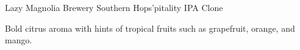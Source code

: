 \begin{recipe}{Lazy Magnolia Brewery Southern Hops'pitality IPA Clone}

\begin{aboutblock}
Bold citrus aroma with hints of tropical fruits such as grapefruit, orange,
and mango. \sourceaha
\end{aboutblock}


\begin{methodandtiming}
 
\begin{mashsteps}
\end{mashsteps}

\begin{fermentationsteps}
\end{fermentationsteps}

\end{methodandtiming}

\recipebreak

\begin{ingredientsblock}

\begin{malts}
\end{malts}

\begin{hops}
\end{hops}


\end{ingredientsblock}

\end{recipe}

